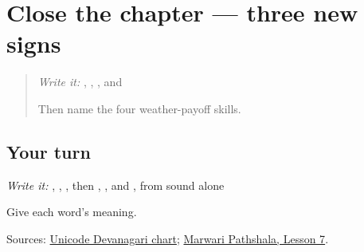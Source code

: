 \section[Practice]{Close the chapter — three new signs}

\label{lesson:MW-R12-script-close}



\begin{quote}
\emph{Write it:} \textbf{}, \textbf{}, \textbf{}, and \textbf{}

Then name the four weather-payoff skills.
\end{quote}

\subsection*{Your turn}
\emph{Write it:} \textbf{}, \textbf{}, \textbf{}, then \textbf{}, \textbf{}, and \textbf{}, from sound alone

Give each word's meaning.

\begin{tcolorbox}[breakable,colback=teal!4,colframe=teal!35!black,title={Before you move on}]
Sources: \href{https://www.unicode.org/charts/PDF/U0900.pdf}{Unicode Devanagari chart}; \href{https://www.marwaripathshala.com/marwari-lesson-7-english}{Marwari Pathshala, Lesson 7}.
\end{tcolorbox}
